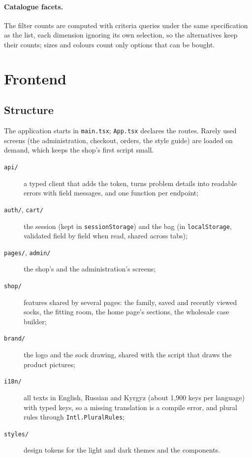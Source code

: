 \paragraph{Catalogue facets.} The filter counts are computed with criteria queries under the same specification as the
list, each dimension ignoring its own selection, so the alternatives keep their counts; sizes and colours count only
options that can be bought.

\section{Frontend}
\label{sec:frontend}

\subsection{Structure}

The application starts in \texttt{main.tsx}; \texttt{App.tsx} declares the routes. Rarely used screens (the
administration, checkout, orders, the style guide) are loaded on demand, which keeps the shop's first script small.
\begin{description}
	\item[\texttt{api/}] a typed client that adds the token, turns problem details into readable errors with field
	messages, and one function per endpoint;
	\item[\texttt{auth/}, \texttt{cart/}] the session (kept in \texttt{sessionStorage}) and the bag (in
	\texttt{localStorage}, validated field by field when read, shared across tabs);
	\item[\texttt{pages/}, \texttt{admin/}] the shop's and the administration's screens;
	\item[\texttt{shop/}] features shared by several pages: the family, saved and recently viewed socks, the fitting room,
	the home page's sections, the wholesale case builder;
	\item[\texttt{brand/}] the logo and the sock drawing, shared with the script that draws the product pictures;
	\item[\texttt{i18n/}] all texts in English, Russian and Kyrgyz (about 1,900 keys per language) with typed keys, so a
	missing translation is a compile error, and plural rules through \texttt{Intl.PluralRules};
	\item[\texttt{styles/}] design tokens for the light and dark themes and the components.
\end{description}

